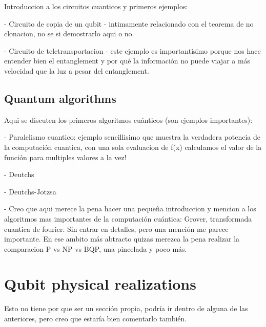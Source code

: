 Introduccion a los circuitos cuanticos y primeros ejemplos:

- Circuito de copia de un qubit - intimamente relacionado con el teorema de no clonacion, no se si demostrarlo aqui o no.

- Circuito de teletransportacion - este ejemplo es importantisimo porque nos hace entender bien el entanglement y por qué la información no puede viajar a más velocidad que la luz a pesar del entanglement.

\subsection{Quantum algorithms}

Aqui se discuten los primeros algoritmos cuánticos (son ejemplos importantes):

- Paralelismo cuantico: ejemplo sencillisimo que muestra la verdadera potencia de la computación cuantica, con una sola evaluacion de f(x) calculamos el valor de la función para multiples valores a la vez!

- Deutchs

- Deutchs-Jotzsa

- Creo que aqui merece la pena hacer una pequeña introduccion y mencion a los algoritmos mas importantes de la computación cuántica: Grover, transformada cuantica de fourier. Sin entrar en detalles, pero una mención me parece importante. En ese ambito más abtracto quizas merezca la pena realizar la comparacion P vs NP vs BQP, una pincelada y poco más.


\section{Qubit physical realizations}

Esto no tiene por que ser un sección propia, podría ir dentro de alguna de las anteriores, pero creo que estaría bien comentarlo también.


